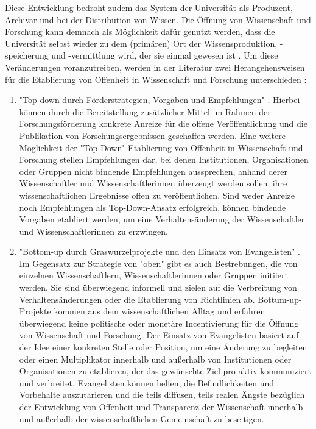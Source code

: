 Diese Entwicklung bedroht zudem das System der Universität als Produzent, Archivar und bei der Distribution von Wissen. Die Öffnung von Wissenschaft und Forschung kann demnach als Möglichkeit dafür genutzt werden, dass die Universität selbst wieder zu dem (primären) Ort der Wissensproduktion, -speicherung und -vermittlung wird, der sie einmal gewesen ist \cite{Kittler_2004}. Um diese Veränderungen voranzutreiben, werden in der Literatur zwei Herangehensweisen für die Etablierung von Offenheit in Wissenschaft und Forschung unterschieden \cite{Schulze_2013}:
\begin{enumerate}
\item "Top-down durch Förderstrategien, Vorgaben und Empfehlungen" \cite[:34]{Schulze_2013}. Hierbei können durch die Bereitstellung zusätzlicher Mittel im Rahmen der Forschungsförderung konkrete Anreize für die offene Veröffentlichung und die Publikation von Forschungsergebnissen geschaffen werden. Eine weitere Möglichkeit der "Top-Down"-Etablierung von Offenheit in Wissenschaft und Forschung stellen Empfehlungen dar, bei denen Institutionen, Organisationen oder Gruppen nicht bindende Empfehlungen aussprechen, anhand derer Wissenschaftler und Wissenschaftlerinnen überzeugt werden sollen, ihre wissenschaftlichen Ergebnisse offen zu veröffentlichen. Sind weder Anreize noch Empfehlungen als Top-Down-Ansatz erfolgreich, können bindende Vorgaben etabliert werden, um eine Verhaltensänderung der Wissenschaftler und Wissenschaftlerinnen zu erzwingen.
\item "Bottom-up durch Graswurzelprojekte und den Einsatz von Evangelisten" \cite[:34]{Schulze_2013}. Im Gegensatz zur Strategie von "oben" gibt es auch Bestrebungen, die von einzelnen Wissenschaftlern, Wissenschaftlerinnen oder Gruppen initiiert werden. Sie sind überwiegend informell und zielen auf die Verbreitung von Verhaltensänderungen oder die Etablierung von Richtlinien ab. Bottum-up-Projekte kommen aus dem wissenschaftlichen Alltag und erfahren überwiegend keine politische oder monetäre Incentivierung für die Öffnung von Wissenschaft und Forschung. Der Einsatz von Evangelisten basiert auf der Idee einer konkreten Stelle oder Position, um eine Änderung zu begleiten oder einen Multiplikator innerhalb und außerhalb von Institutionen oder Organisationen zu etablieren, der das gewünschte Ziel pro aktiv kommuniziert und verbreitet. Evangelisten können helfen, die Befindlichkeiten und Vorbehalte auszutarieren und die teils diffusen, teils realen Ängste bezüglich der Entwicklung von Offenheit und Transparenz der Wissenschaft innerhalb und außerhalb der wissenschaftlichen Gemeinschaft zu beseitigen.
\end{enumerate}

